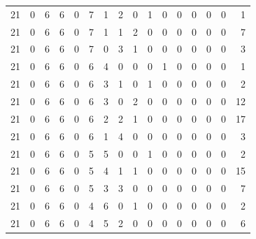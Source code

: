\begin{appendix}
{\begin{longtable}{lrrrrrrrrrrrrrrr}
    21        & 0  & 6  & 6  & 0  & 7  & 1  & 2  & 0  & 1  & 0  & 0  & 0   & 0   & 0   & 1    \\
    21        & 0  & 6  & 6  & 0  & 7  & 1  & 1  & 2  & 0  & 0  & 0  & 0   & 0   & 0   & 7    \\
    21        & 0  & 6  & 6  & 0  & 7  & 0  & 3  & 1  & 0  & 0  & 0  & 0   & 0   & 0   & 3    \\
    21        & 0  & 6  & 6  & 0  & 6  & 4  & 0  & 0  & 0  & 1  & 0  & 0   & 0   & 0   & 1    \\
    21        & 0  & 6  & 6  & 0  & 6  & 3  & 1  & 0  & 1  & 0  & 0  & 0   & 0   & 0   & 2    \\
    21        & 0  & 6  & 6  & 0  & 6  & 3  & 0  & 2  & 0  & 0  & 0  & 0   & 0   & 0   & 12   \\
    21        & 0  & 6  & 6  & 0  & 6  & 2  & 2  & 1  & 0  & 0  & 0  & 0   & 0   & 0   & 17   \\
    21        & 0  & 6  & 6  & 0  & 6  & 1  & 4  & 0  & 0  & 0  & 0  & 0   & 0   & 0   & 3    \\
    21        & 0  & 6  & 6  & 0  & 5  & 5  & 0  & 0  & 1  & 0  & 0  & 0   & 0   & 0   & 2    \\
    21        & 0  & 6  & 6  & 0  & 5  & 4  & 1  & 1  & 0  & 0  & 0  & 0   & 0   & 0   & 15   \\
    21        & 0  & 6  & 6  & 0  & 5  & 3  & 3  & 0  & 0  & 0  & 0  & 0   & 0   & 0   & 7    \\
    21        & 0  & 6  & 6  & 0  & 4  & 6  & 0  & 1  & 0  & 0  & 0  & 0   & 0   & 0   & 2    \\
    21        & 0  & 6  & 6  & 0  & 4  & 5  & 2  & 0  & 0  & 0  & 0  & 0   & 0   & 0   & 6    \\
\end{longtable}}

\end{appendix}
